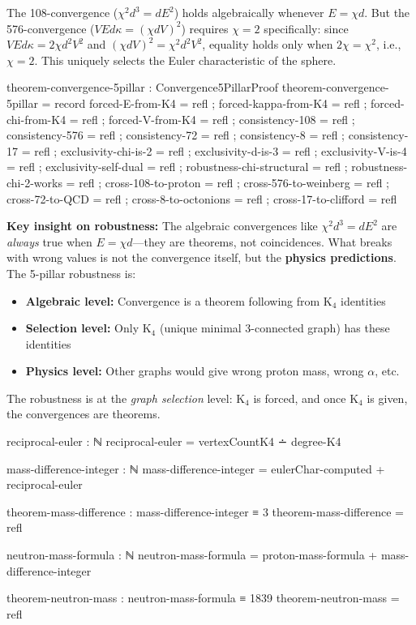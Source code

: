 \documentclass[11pt,a4paper]{book}
\begin{document}
The 108-convergence ($\chi^2 d^3 = dE^2$) holds algebraically whenever $E = \chi d$.
But the 576-convergence ($VEd\kappa = (\chi dV)^2$) requires $\chi = 2$ specifically:
since $VEd\kappa = 2\chi d^2 V^2$ and $(\chi dV)^2 = \chi^2 d^2 V^2$, equality holds 
only when $2\chi = \chi^2$, i.e., $\chi = 2$. This uniquely selects the Euler 
characteristic of the sphere.

\begin{code}
theorem-convergence-5pillar : Convergence5PillarProof
theorem-convergence-5pillar = record
  { forced-E-from-K4 = refl
  ; forced-kappa-from-K4 = refl
  ; forced-chi-from-K4 = refl
  ; forced-V-from-K4 = refl
  ; consistency-108 = refl
  ; consistency-576 = refl
  ; consistency-72 = refl
  ; consistency-8 = refl
  ; consistency-17 = refl
  ; exclusivity-chi-is-2 = refl
  ; exclusivity-d-is-3 = refl
  ; exclusivity-V-is-4 = refl
  ; exclusivity-self-dual = refl
  ; robustness-chi-structural = refl
  ; robustness-chi-2-works = refl
  ; cross-108-to-proton = refl
  ; cross-576-to-weinberg = refl
  ; cross-72-to-QCD = refl
  ; cross-8-to-octonions = refl
  ; cross-17-to-clifford = refl
  }
\end{code}

\textbf{Key insight on robustness:} The algebraic convergences like $\chi^2 d^3 = d E^2$ 
are \emph{always} true when $E = \chi d$---they are theorems, not coincidences. 
What breaks with wrong values is not the convergence itself, but the 
\textbf{physics predictions}. The 5-pillar robustness is:

\begin{itemize}
\item \textbf{Algebraic level:} Convergence is a theorem following from K$_4$ identities
\item \textbf{Selection level:} Only K$_4$ (unique minimal 3-connected graph) has these identities  
\item \textbf{Physics level:} Other graphs would give wrong proton mass, wrong $\alpha$, etc.
\end{itemize}

The robustness is at the \emph{graph selection} level: K$_4$ is forced, and once 
K$_4$ is given, the convergences are theorems.

\begin{code}
reciprocal-euler : ℕ
reciprocal-euler = vertexCountK4 ∸ degree-K4

mass-difference-integer : ℕ
mass-difference-integer = eulerChar-computed + reciprocal-euler

theorem-mass-difference : mass-difference-integer ≡ 3
theorem-mass-difference = refl

neutron-mass-formula : ℕ
neutron-mass-formula = proton-mass-formula + mass-difference-integer

theorem-neutron-mass : neutron-mass-formula ≡ 1839
theorem-neutron-mass = refl
\end{code}
\end{document}

